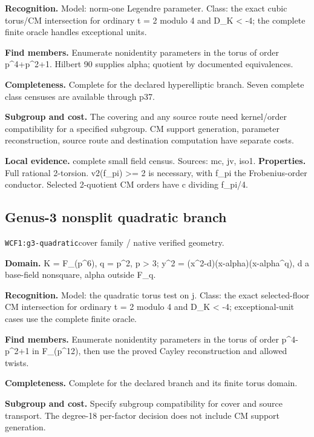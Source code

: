 \documentclass[10pt]{article}
\begin{document}
\textbf{Recognition.} Model: norm-one Legendre parameter. Class: the exact cubic torus/CM intersection for ordinary t = 2 modulo 4 and D\_K < -4; the complete finite oracle handles exceptional units.\par
\textbf{Find members.} Enumerate nonidentity parameters in the torus of order p\textasciicircum{}4+p\textasciicircum{}2+1. Hilbert 90 supplies alpha; quotient by documented equivalences.\par
\textbf{Completeness.} Complete for the declared hyperelliptic branch. Seven complete class censuses are available through p37.\par
\textbf{Subgroup and cost.} The covering and any source route need kernel/order compatibility for a specified subgroup. CM support generation, parameter reconstruction, source route and destination computation have separate costs.\par
\textbf{Local evidence.} complete small field census. Sources: mc, jv, iso1.
\textbf{Properties.} Full rational 2-torsion. v2(f\_pi) >= 2 is necessary, with f\_pi the Frobenius-order conductor. Selected 2-quotient CM orders have c dividing f\_pi/4.\par
{}\subsection{Genus-3 nonsplit quadratic branch}
\texttt{WCF1:g3-quadratic}\quad cover family / native verified geometry.\par
\textbf{Domain.} K = F\_(p\textasciicircum{}6), q = p\textasciicircum{}2, p > 3; y\textasciicircum{}2 = (x\textasciicircum{}2-d)(x-alpha)(x-alpha\textasciicircum{}q), d a base-field nonsquare, alpha outside F\_q.\par
\textbf{Recognition.} Model: the quadratic torus test on j. Class: the exact selected-floor CM intersection for ordinary t = 2 modulo 4 and D\_K < -4; exceptional-unit cases use the complete finite oracle.\par
\textbf{Find members.} Enumerate nonidentity parameters in the torus of order p\textasciicircum{}4-p\textasciicircum{}2+1 in F\_(p\textasciicircum{}12), then use the proved Cayley reconstruction and allowed twists.\par
\textbf{Completeness.} Complete for the declared branch and its finite torus domain.\par
\textbf{Subgroup and cost.} Specify subgroup compatibility for cover and source transport. The degree-18 per-factor decision does not include CM support generation.\par
\end{document}
